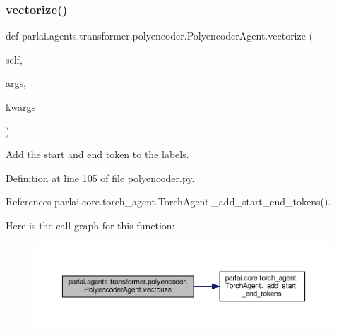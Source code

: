 \subsubsection{\texorpdfstring{vectorize()}{vectorize()}}
{\footnotesize\ttfamily def parlai.\+agents.\+transformer.\+polyencoder.\+Polyencoder\+Agent.\+vectorize (\begin{DoxyParamCaption}\item[{}]{self,  }\item[{}]{args,  }\item[{}]{kwargs }\end{DoxyParamCaption})}

\begin{DoxyVerb}Add the start and end token to the labels.\end{DoxyVerb}
 

Definition at line 105 of file polyencoder.\+py.



References parlai.\+core.\+torch\+\_\+agent.\+Torch\+Agent.\+\_\+add\+\_\+start\+\_\+end\+\_\+tokens().

Here is the call graph for this function\+:
\nopagebreak
\begin{figure}[H]
\begin{center}
\leavevmode
\includegraphics[width=350pt]{classparlai_1_1agents_1_1transformer_1_1polyencoder_1_1PolyencoderAgent_a02cea5573a5135f5a7201c49296abded_cgraph}
\end{center}
\end{figure}
\mbox{\label{classparlai_1_1agents_1_1transformer_1_1polyencoder_1_1PolyencoderAgent_ad002f52bc5bfbe8269983bbfc0988f98}} 
